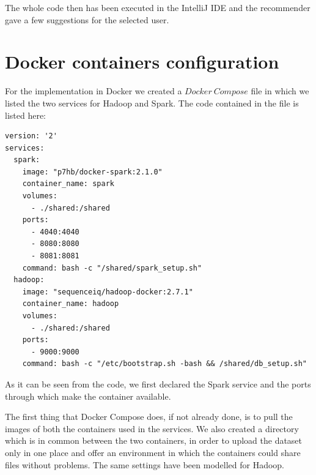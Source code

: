 \documentclass[11pt,a4paper,titlepage]{article}
\begin{document}
The whole code then has been executed in the IntelliJ IDE and the recommender gave a few suggestions for the selected user.

\section{Docker containers configuration}
For the implementation in Docker we created a $Docker ~Compose$ file in which we listed the two services for Hadoop and Spark. The code contained in the file is listed here:

\begin{lstlisting}[style=myBashstyle]
version: '2'
services:
  spark:
    image: "p7hb/docker-spark:2.1.0"
    container_name: spark
    volumes:
      - ./shared:/shared
    ports:
      - 4040:4040
      - 8080:8080
      - 8081:8081
    command: bash -c "/shared/spark_setup.sh"
  hadoop:
    image: "sequenceiq/hadoop-docker:2.7.1"
    container_name: hadoop
    volumes:
      - ./shared:/shared
    ports:
      - 9000:9000
    command: bash -c "/etc/bootstrap.sh -bash && /shared/db_setup.sh"
\end{lstlisting}

As it can be seen from the code, we first declared the Spark service and the ports through which make the container available.

The first thing that Docker Compose does, if not already done, is to pull the images of both the containers used in the services. 
We also created a directory which is in common between the two containers, in order to upload the dataset only in one place and offer an environment in which the containers could share files without problems. The same settings have been modelled for Hadoop.
\end{document}
